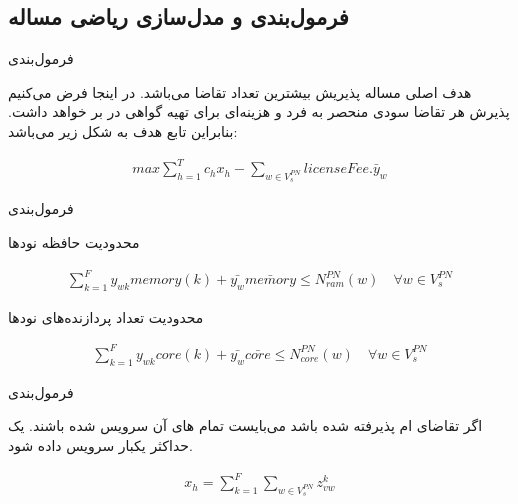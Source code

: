 \documentclass{beamer}
\begin{document}
\begin{persian}
\begin{frame}{}
    \section{فرمول‌بندی و مدل‌سازی ریاضی مساله}
\end{frame}
\begin{frame}{فرمول‌بندی}
    \par
    هدف اصلی مساله پذیریش بیشترین تعداد تقاضا می‌باشد.
    در اینجا فرض می‌کنیم پذیرش هر تقاضا سودی منحصر به فرد و هزینه‌ای برای تهیه گواهی  در بر خواهد داشت.
    بنابراین تابع هدف به شکل زیر می‌باشد:

    \begin{latin}\begin{align}
        max \sum_{h=1}^{T} c_hx_h - \sum_{w \in V_s^{PN}} licenseFee . \bar{y}_w
    \end{align}\end{latin}
\end{frame}
\begin{frame}{فرمول‌بندی}
    \par
    محدودیت حافظه نودها
    \begin{latin}\begin{align}
        \sum_{k=1}^F y_{wk} memory(k) + \bar{y_w} \bar{memory} \le N_{ram}^{PN}(w)
        \quad
        \forall w \in V_s^{PN}
    \end{align}\end{latin}
    \par
    محدودیت تعداد پردازنده‌های نودها
    \begin{latin}\begin{align}
        \sum_{k=1}^F y_{wk} core(k) + \bar{y_w} \bar{core} \le N_{core}^{PN}(w)
        \quad
        \forall w \in V_s^{PN}
    \end{align}\end{latin}
\end{frame}
\begin{frame}{فرمول‌بندی}
    \par
    اگر تقاضای ام پذیرفته شده باشد
    می‌بایست تمام های آن‌
    سرویس شده باشند.
    یک  حداکثر یکبار سرویس داده شود.
    \begin{latin}\begin{align}
        x_h = \sum_{k=1}^{F} \sum_{w \in V_{s}^{PN}} z_{vw}^{k}

\end{align}
\end{latin}
\end{frame}
\end{persian}
\end{document}
